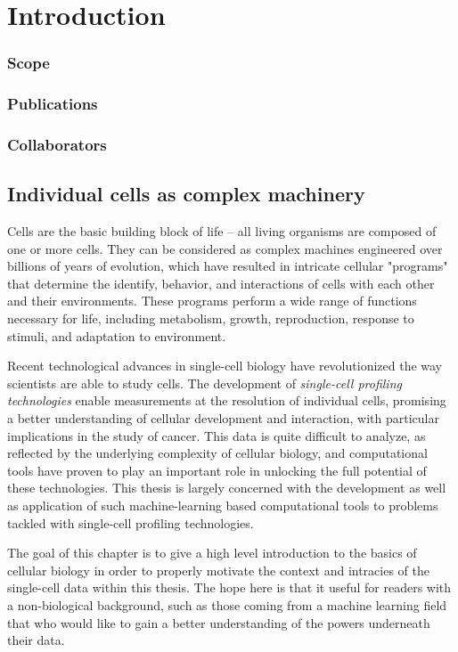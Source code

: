 \chapter{Introduction}

\subsection{Scope}
\subsection{Publications}
\subsection{Collaborators}

\section{Individual cells as complex machinery}
Cells are the basic building block of life -- all living organisms are composed of one or more cells.
They can be considered as complex machines engineered over billions of years of evolution,
which have resulted in intricate cellular "programs" that determine the identify, behavior, and interactions of cells with each other and their environments.
These programs perform a wide range of functions necessary for life, including metabolism, growth, reproduction, response to stimuli, and adaptation to environment.

Recent technological advances in single-cell biology have revolutionized the way scientists are able to study cells.
The development of \emph{single-cell profiling technologies} enable measurements at the resolution of individual cells,
promising a better understanding of cellular development and interaction, with particular implications in the study of cancer.
This data is quite difficult to analyze, as reflected by the underlying complexity of cellular biology, and
computational tools have proven to play an important role in unlocking the full potential of these technologies.
This thesis is largely concerned with the development as well as application of such machine-learning based computational tools to problems tackled with single-cell profiling technologies.

The goal of this chapter is to give a high level introduction to the basics of cellular biology in order to properly motivate the context and intracies of the single-cell data within this thesis.
The hope here is that it useful for readers with a non-biological background, such as those coming from a machine learning field that who would like to gain a better understanding of the powers underneath their data.

